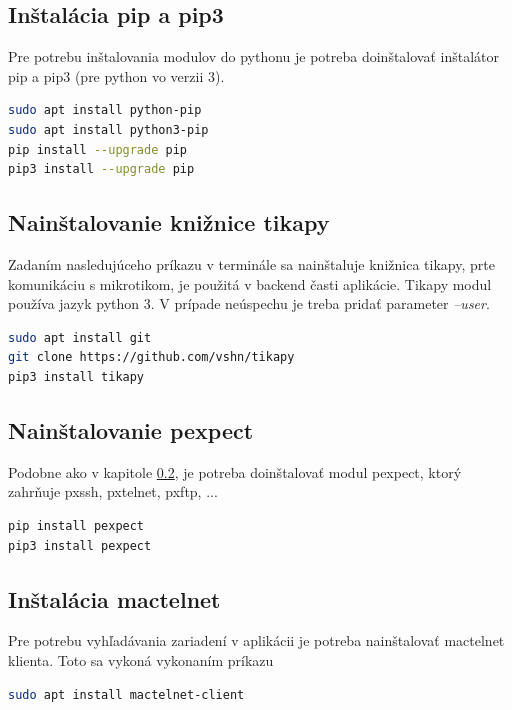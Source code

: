\subsection{Inštalácia pip a pip3}
Pre potrebu inštalovania modulov do pythonu je potreba doinštalovať inštalátor pip a pip3 (pre python vo verzii 3).
\begin{lstlisting}[language=bash, frame=single, caption=Nainštalovanie pip,captionpos=b, showstringspaces=false, basicstyle=\footnotesize]
sudo apt install python-pip
sudo apt install python3-pip
pip install --upgrade pip
pip3 install --upgrade pip
\end{lstlisting}
\subsection{Nainštalovanie knižnice tikapy}
\label{sec:tikapy}
Zadaním nasledujúceho príkazu v terminále sa nainštaluje knižnica tikapy, prte komunikáciu s mikrotikom, je použitá v backend časti aplikácie. Tikapy modul používa jazyk python 3. V prípade neúspechu je treba pridať parameter \textit{--user}.
\begin{lstlisting}[language=bash, frame=single, caption=Nainštalovanie tikapy,captionpos=b, showstringspaces=false, basicstyle=\footnotesize]
sudo apt install git
git clone https://github.com/vshn/tikapy
pip3 install tikapy
\end{lstlisting}
\subsection{Nainštalovanie pexpect}
Podobne ako v kapitole \ref{sec:tikapy}, je potreba doinštalovať modul pexpect, ktorý zahrňuje pxssh, pxtelnet, pxftp, ...
\begin{lstlisting}[language=bash, frame=single, caption=Nainštalovanie pexpect,captionpos=b, showstringspaces=false, basicstyle=\footnotesize]
pip install pexpect
pip3 install pexpect
\end{lstlisting}
\subsection{Inštalácia mactelnet}
Pre potrebu vyhľadávania zariadení v aplikácii je potreba nainštalovať mactelnet klienta. Toto sa vykoná vykonaním príkazu
\begin{lstlisting}[language=bash, frame=single, caption=Nainštalovanie mactelnet,captionpos=b, showstringspaces=false, basicstyle=\footnotesize]
sudo apt install mactelnet-client
\end{lstlisting}
